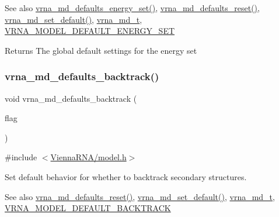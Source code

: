 \begin{DoxySeeAlso}{See also}
\mbox{\hyperlink{group__model__details_ga8dd29c55787a4576277e1907e92d810c}{vrna\+\_\+md\+\_\+defaults\+\_\+energy\+\_\+set()}}, \mbox{\hyperlink{group__model__details_ga70834424cf804d149937de89f80ceb45}{vrna\+\_\+md\+\_\+defaults\+\_\+reset()}}, \mbox{\hyperlink{group__model__details_ga8ac6ff84936282436f822644bf841f66}{vrna\+\_\+md\+\_\+set\+\_\+default()}}, \mbox{\hyperlink{group__model__details_ga1f8a10e12a0a1915f2a4eff0b28ea17c}{vrna\+\_\+md\+\_\+t}}, \mbox{\hyperlink{group__model__details_ga6fcf6b2d0f89256cdbd166486c9b6e1e}{V\+R\+N\+A\+\_\+\+M\+O\+D\+E\+L\+\_\+\+D\+E\+F\+A\+U\+L\+T\+\_\+\+E\+N\+E\+R\+G\+Y\+\_\+\+S\+ET}} 
\end{DoxySeeAlso}
\begin{DoxyReturn}{Returns}
The global default settings for the energy set 
\end{DoxyReturn}
\mbox{\label{group__model__details_ga978c468b2fe96a70d5191e3dd17d5599}} 
\subsubsection{\texorpdfstring{vrna\+\_\+md\+\_\+defaults\+\_\+backtrack()}{vrna\_md\_defaults\_backtrack()}}
{\footnotesize\ttfamily void vrna\+\_\+md\+\_\+defaults\+\_\+backtrack (\begin{DoxyParamCaption}\item[{int}]{flag }\end{DoxyParamCaption})}



{\ttfamily \#include $<$\mbox{\hyperlink{model_8h}{Vienna\+R\+N\+A/model.\+h}}$>$}



Set default behavior for whether to backtrack secondary structures. 

\begin{DoxySeeAlso}{See also}
\mbox{\hyperlink{group__model__details_ga70834424cf804d149937de89f80ceb45}{vrna\+\_\+md\+\_\+defaults\+\_\+reset()}}, \mbox{\hyperlink{group__model__details_ga8ac6ff84936282436f822644bf841f66}{vrna\+\_\+md\+\_\+set\+\_\+default()}}, \mbox{\hyperlink{group__model__details_ga1f8a10e12a0a1915f2a4eff0b28ea17c}{vrna\+\_\+md\+\_\+t}}, \mbox{\hyperlink{group__model__details_ga3fda8006ab84baf817bd8e5ccbc6bb35}{V\+R\+N\+A\+\_\+\+M\+O\+D\+E\+L\+\_\+\+D\+E\+F\+A\+U\+L\+T\+\_\+\+B\+A\+C\+K\+T\+R\+A\+CK}} 
\end{DoxySeeAlso}

